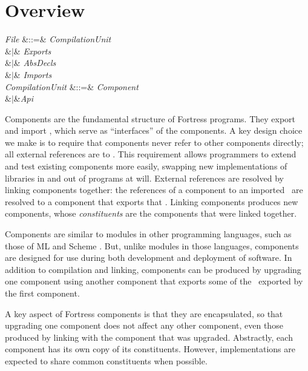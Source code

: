 %
%
%
%

\section{Overview}
\begin{Grammar}
\emph{File} &::=& \emph{CompilationUnit}\\
&$|$&  \emph{Exports} \\
&$|$&  \emph{AbsDecls}\\
&$|$& \emph{Imports} \\

\emph{CompilationUnit} &::=& \emph{Component}\\
&$|$&\emph{Api}\\
\end{Grammar}

Components are the fundamental structure of Fortress programs.
They export and import \apisN,
which serve as ``interfaces'' of the components.
A key design choice we make
is to require that components never refer
to other components directly;
all external references are to \apisN.
This requirement allows programmers
to extend and test existing components more easily,
swapping new implementations of libraries in and out of programs at will.
External references are resolved by linking components together:
the references of a component to an imported \apiN\
are resolved to a component that exports that \apiN.
Linking components produces new components,
whose \emph{constituents} are the components that were linked together.

Components are similar to modules in other programming languages,
such as those of ML and Scheme \cite{SML, OCaml, Scheme}.
But, unlike modules in those languages, components
are designed for use during both development and deployment of software.
In addition to compilation and linking,
components can be produced by upgrading one component
using another component that exports
some of the \apisN\ exported by the first component.

A key aspect of Fortress components is that they are encapsulated,
so that upgrading one component does not affect any other component,
even those produced by linking with the component that was upgraded.
Abstractly, each component has its own copy of its constituents.
However, implementations are expected to share common constituents
when possible.

